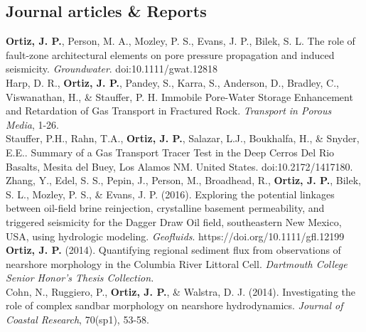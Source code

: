 \documentclass[11pt, letterpaper]{article}
\newcommand{\amper}{{\fontspec[Scale=.95]{Adobe Caslon Pro}\selectfont\itshape\&}}
\newcommand{\years}[1]{\marginnote{\scriptsize #1}}
\begin{document}
\subsection*{Journal articles \& Reports}
\noindent
\years{2018}\textbf{Ortiz, J. P.}, Person, M. A., Mozley, P. S., Evans, J. P., Bilek, S. L. The role of fault-zone architectural elements on pore pressure propagation and induced seismicity. \emph{Groundwater}. doi:10.1111/gwat.12818\\
\years{2018}Harp, D. R., \textbf{Ortiz, J. P.}, Pandey, S., Karra, S., Anderson, D., Bradley, C., Viswanathan, H., \& Stauffer, P. H. Immobile Pore-Water Storage Enhancement and Retardation of Gas Transport in Fractured Rock. \emph{Transport in Porous Media}, 1-26.\\
\years{2018}Stauffer, P.H., Rahn, T.A., \textbf{Ortiz, J. P.}, Salazar, L.J., Boukhalfa, H., \& Snyder, E.E.. Summary of a Gas Transport Tracer Test in the Deep Cerros Del Rio Basalts, Mesita del Buey, Los Alamos NM. United States. doi:10.2172/1417180.\\
\years{2016}Zhang, Y., Edel, S. S., Pepin, J., Person, M., Broadhead, R., \textbf{Ortiz, J. P.}, Bilek, S. L., Mozley, P. S., \& Evans, J. P. (2016). Exploring the potential linkages between oil-field brine reinjection, crystalline basement permeability, and triggered seismicity for the Dagger Draw Oil field, southeastern New Mexico, USA, using hydrologic modeling. \emph{Geofluids}. https://doi.org/10.1111/gfl.12199\\ 
\years{2014}\textbf{Ortiz, J. P.} (2014). Quantifying regional sediment flux from observations of nearshore morphology in the Columbia River Littoral Cell. \emph{Dartmouth College Senior Honor's Thesis Collection.}\\
\years{2014}Cohn, N., Ruggiero, P., \textbf{Ortiz, J. P.}, \& Walstra, D. J. (2014). Investigating the role of complex sandbar morphology on nearshore hydrodynamics. \emph{Journal of Coastal Research}, 70(sp1), 53-58.

\end{document}

